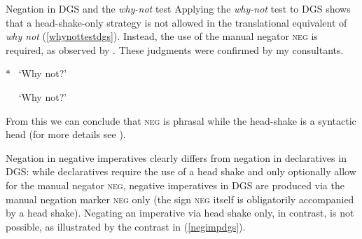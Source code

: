 \begin{digression}{Negation in DGS and the \textit{why-not} test}{}
Applying the \textit{why-not} test to DGS shows that a head-shake-only strategy is not allowed in the translational equivalent of \textit{why not} (\ref{whynottestdgs}). Instead, the use of the manual negator \textsc{neg} is required, as observed by \citet[56]{pfau2016featural}. These judgments were confirmed by my consultants. 

\begin{exe}
\ex\label{whynottestdgs}\begin{xlist}
\ex\label{ex:modaldoublingneg} *
\glt \textcolor{white}{*}`Why not?'

\ex\label{ex:modaldoublingnegb} \textcolor{white}{*}
\glt \textcolor{white}{*}`Why not?'
\end{xlist}
\end{exe}


\noindent From this we can conclude that \textsc{neg} is phrasal while the head-shake is a syntactic head (for more details see \citealt{pfau2016featural}).

 

\end{digression}

\noindent Negation in negative imperatives clearly differs from negation in declaratives in DGS: while declaratives require the use of a head shake and only optionally allow for the manual negator \textsc{neg}, negative imperatives in DGS are produced via the manual negation marker \textsc{neg} only (the sign \textsc{neg} itself is obligatorily accompanied by a head shake). Negating an imperative via head shake only, in contrast, is not possible, as illustrated by the contrast in (\ref{negimpdgs}).   

